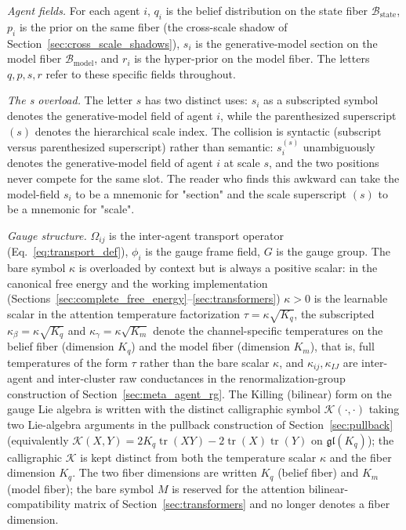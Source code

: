 \documentclass[11pt]{article}
\begin{document}
\emph{Agent fields.} For each agent $i$, $q_i$ is the belief distribution on the state fiber $\mathcal{B}_{\mathrm{state}}$, $p_i$ is the prior on the same fiber (the cross-scale shadow of Section~\ref{sec:cross_scale_shadows}), $s_i$ is the generative-model section on the model fiber $\mathcal{B}_{\mathrm{model}}$, and $r_i$ is the hyper-prior on the model fiber. The letters $q, p, s, r$ refer to these specific fields throughout.

\emph{The s overload.} The letter $s$ has two distinct uses: $s_i$ as a subscripted symbol denotes the generative-model field of agent $i$, while the parenthesized superscript $(s)$ denotes the hierarchical scale index. The collision is syntactic (subscript versus parenthesized superscript) rather than semantic: $s_i^{(s)}$ unambiguously denotes the generative-model field of agent $i$ at scale $s$, and the two positions never compete for the same slot. The reader who finds this awkward can take the model-field $s_i$ to be a mnemonic for "section" and the scale superscript $(s)$ to be a mnemonic for "scale".

\emph{Gauge structure.} $\Omega_{ij}$ is the inter-agent transport operator (Eq.~\ref{eq:transport_def}), $\phi_i$ is the gauge frame field, $G$ is the gauge group. The bare symbol $\kappa$ is overloaded by context but is always a positive scalar: in the canonical free energy and the working implementation (Sections~\ref{sec:complete_free_energy}--\ref{sec:transformers}) $\kappa > 0$ is the learnable scalar in the attention temperature factorization $\tau = \kappa\sqrt{K_q}$, the subscripted $\kappa_\beta = \kappa\sqrt{K_q}$ and $\kappa_\gamma = \kappa\sqrt{K_m}$ denote the channel-specific temperatures on the belief fiber (dimension $K_q$) and the model fiber (dimension $K_m$), that is, full temperatures of the form $\tau$ rather than the bare scalar $\kappa$, and $\kappa_{ij}, \kappa_{IJ}$ are inter-agent and inter-cluster raw conductances in the renormalization-group construction of Section~\ref{sec:meta_agent_rg}. The Killing (bilinear) form on the gauge Lie algebra is written with the distinct calligraphic symbol $\mathcal{K}(\cdot,\cdot)$ taking two Lie-algebra arguments in the pullback construction of Section~\ref{sec:pullback} (equivalently $\mathcal{K}(X,Y) = 2K_q\operatorname{tr}(XY) - 2\operatorname{tr}(X)\operatorname{tr}(Y)$ on $\mathfrak{gl}(K_q)$); the calligraphic $\mathcal{K}$ is kept distinct from both the temperature scalar $\kappa$ and the fiber dimension $K_q$. The two fiber dimensions are written $K_q$ (belief fiber) and $K_m$ (model fiber); the bare symbol $M$ is reserved for the attention bilinear-compatibility matrix of Section~\ref{sec:transformers} and no longer denotes a fiber dimension.
\end{document}
